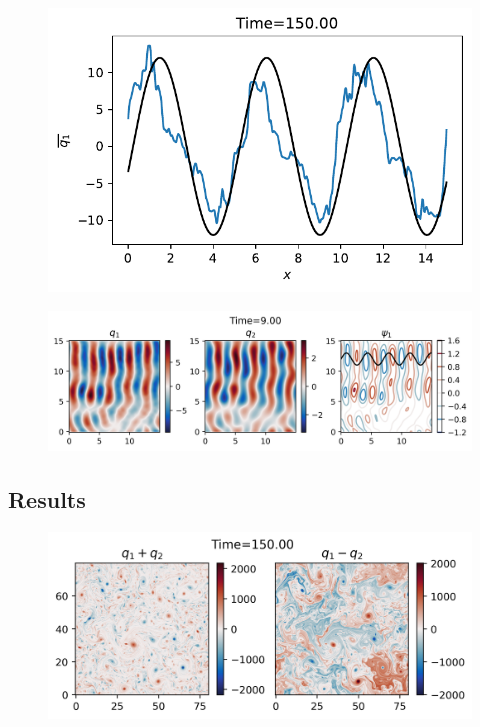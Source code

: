 \begin{figure}
    \centering
    \includegraphics{2Layjets_q1zonalmean_t150d00}
    \caption{}
    \label{fig:2Layjets_q1zonalmean_t150d00}
\end{figure}

\begin{figure}
    \centering
    \includegraphics{2Layjets_q1_t9d00}
    \caption{}
    \label{fig:2Layjets_q1_t9d00}
\end{figure}

\subsection{Results}

\begin{figure}
    \centering
    \includegraphics{2Lay_qbrbc_t150d00}
    \caption{}
    \label{fig:2Lay_qbrbc_t150d00}
\end{figure}

